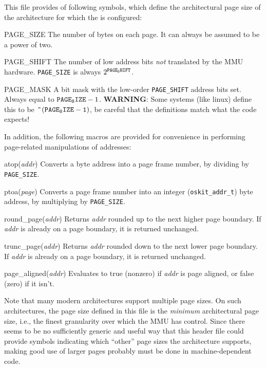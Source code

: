 \label{page-h}
\begin{apisyn}
\end{apisyn}
\begin{apidesc}
	This file provides of following symbols,
	which define the architectural page size
	of the architecture for which the \oskit{} is configured:
	\begin{icsymlist}
	\item[PAGE_SIZE]
		The number of bytes on each page.
		It can always be assumed to be a power of two.
	\item[PAGE_SHIFT]
		The number of low address bits \emph{not} translated
		by the MMU hardware.
		{\tt PAGE_SIZE} is always $2^{\tt PAGE_SHIFT}$.
	\item[PAGE_MASK]
		A bit mask with the low-order {\tt PAGE_SHIFT} address bits set.
		Always equal to ${\tt PAGE_SIZE}-1$.  {\bf WARNING}:
		Some systems (like linux) define this to be
		${\tt~\tilde{}~(PAGE_SIZE - 1)}$, be careful that the
		definitions match what the code expects!
	\end{icsymlist}

	In addition, the following macros are provided
	for convenience in performing page-related manipulations of addresses:
	\begin{csymlist}
	\item[atop(\emph{addr})]		
		Converts a byte address into a page frame number,
		by dividing by {\tt PAGE_SIZE}.
	\item[ptoa(\emph{page})]		
		Converts a page frame number
		into an integer ({\tt oskit_addr_t}) byte address,
		by multiplying by {\tt PAGE_SIZE}.
	\item[round_page(\emph{addr})]	
		Returns \emph{addr} rounded up to the next higher page boundary.
		If \emph{addr} is already on a page boundary,
		it is returned unchanged.
	\item[trunc_page(\emph{addr})]	
		Returns \emph{addr} rounded down to the next lower page boundary.
		If \emph{addr} is already on a page boundary,
		it is returned unchanged.
	\item[page_aligned(\emph{addr})]	
		Evaluates to true (nonzero) if \emph{addr} is page aligned,
		or false (zero) if it isn't.
	\end{csymlist}

	Note that many modern architectures support multiple page sizes.
	On such architectures, the page size defined in this file
	is the \emph{minimum} architectural page size,
	i.e., the finest granularity over which the MMU has control.
	Since there seems to be no sufficiently generic and useful way
	that this header file could provide symbols
	indicating which ``other'' page sizes the architecture supports,
	making good use of larger pages probably must be done
	in machine-dependent code.


\end{apidesc}
